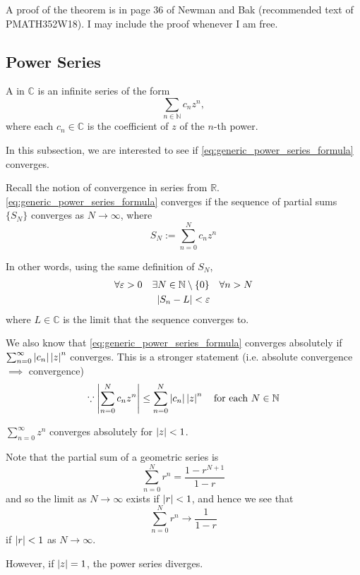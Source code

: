 \documentclass[notoc,notitlepage]{tufte-book}
\begin{document}
A proof of the theorem is in page 36 of Newman and Bak (recommended text of PMATH352W18). I may include the proof whenever I am free.


\subsection{Power Series} %
\label{sub:power_series}

\begin{defn}\label{defn:power_series}
	A  in $\mathbb{C}$ is an infinite series of the form
	\begin{equation}\label{eq:generic_power_series_formula}
		\sum_{n \in \mathbb{N}} c_n z^n,
	\end{equation}
	where each $c_n \in \mathbb{C}$ is the coefficient of $z$ of the $n$-th power.
\end{defn}

In this subsection, we are interested to see if \cref{eq:generic_power_series_formula} converges.

Recall the notion of convergence in series from $\mathbb{R}$. \cref{eq:generic_power_series_formula} converges if the sequence of partial sums $\{S_N\}$ converges as $N \to \infty$, where
\begin{equation*}
	S_N := \sum_{n = 0}^{N} c_n z^n
\end{equation*}

In other words, using the same definition of $S_N$,
\begin{gather*}
	\forall \varepsilon > 0 \quad \exists N \in \mathbb{N} \setminus	\{0\} \quad \forall n > N \\
	\left|S_n - L\right| < \varepsilon
\end{gather*}
where $L \in \mathbb{C}$ is the limit that the sequence converges to.

We also know that \cref{eq:generic_power_series_formula} converges absolutely if $\sum_{n = 0}^{\infty} \left|c_n\right| \left|z\right|^n$ converges. This is a stronger statement (i.e. absolute convergence $\implies$ convergence)
\begin{equation*}
	\because \left|\sum_{n = 0}^{N} c_n z^n\right| \leq \sum_{n = 0}^{N} \left|c_n\right| \left|z\right|^n \quad \text{for each } N \in \mathbb{N}
\end{equation*}

\begin{eg}
	$\sum_{n = 0}^{\infty} z^n$ converges absolutely for $\left|z\right| < 1$.

	Note that the partial sum of a geometric series is
	\begin{equation*}
		\sum_{n = 0}^{N} r^n = \frac{1 - r^{N + 1}}{1 - r}
	\end{equation*}
	and so the limit as $N \to \infty$ exists if $\left|r\right| < 1$, and hence we see that
	\begin{equation*}
		\sum_{n = 0}^{N} r^n \to \frac{1}{1 - r} 
	\end{equation*}
	if $\left|r\right| < 1$ as $N \to \infty$.

	However, if $\left|z\right| = 1$, the power series diverges.
\end{eg}
\end{document}
